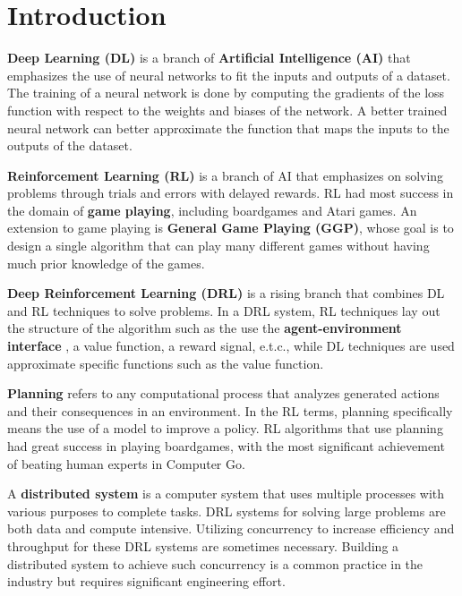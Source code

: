 \section{Introduction} \label{sec:intro}

\textbf{Deep Learning (DL)} is a branch of \textbf{Artificial Intelligence (AI)} that emphasizes the use of neural networks to fit the inputs and outputs of a dataset.
The training of a neural network is done by computing the gradients of the loss function with respect to the weights and biases of the network.
A better trained neural network can better approximate the function that maps the inputs to the outputs of the dataset.

\textbf{Reinforcement Learning (RL)} is a branch of AI that emphasizes on solving problems through trials and errors with delayed rewards.
RL had most success in the domain of \textbf{game playing}, including boardgames and Atari games.
An extension to game playing is \textbf{General Game Playing (GGP)}, whose goal is to design a single algorithm that can play many different games without having much prior knowledge of the games.

\textbf{Deep Reinforcement Learning (DRL)} is a rising branch that combines DL and RL techniques to solve problems.
In a DRL system, RL techniques lay out the structure of the algorithm such as the use the \textbf{agent-environment interface} , a value function, a reward signal, e.t.c., while DL techniques are used approximate specific functions such as the value function.

\textbf{Planning} refers to any computational process that analyzes generated actions and their consequences in an environment.
In the RL terms, planning specifically means the use of a model to improve a policy.
RL algorithms that use planning had great success in playing boardgames, with the most significant achievement of beating human experts in Computer Go.

A \textbf{distributed system} is a computer system that uses multiple processes with various purposes to complete tasks.
DRL systems for solving large problems are both data and compute intensive.
Utilizing concurrency to increase efficiency and throughput for these DRL systems are sometimes necessary.
Building a distributed system to achieve such concurrency is a common practice in the industry but requires significant engineering effort.

